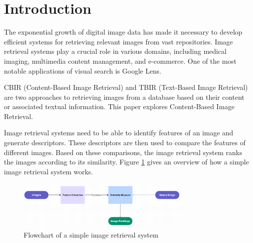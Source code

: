 \section{Introduction}
\label{sec:intro}

The exponential growth of digital image data has made it necessary to develop efficient systems for retrieving
relevant images from vast repositories. Image retrieval systems play a crucial role in various domains, including
medical imaging, multimedia content management, and e-commerce. One of the most notable applications of visual
search is Google Lens.

CBIR (Content-Based Image Retrieval) and TBIR (Text-Based Image Retrieval) are two approaches to retrieving images
from a database based on their content or associated textual information. This paper explores Content-Based Image
Retrieval.

Image retrieval systems need to be able to identify features of an image and generate descriptors.
These descriptors are then used to compare the features of different
images. Based on these comparisons, the image retrieval system ranks the images according to its similarity.
Figure \ref{fig:image_retrieval_flowchart} gives an overview of how a simple image retrieval system works.

\begin{figure}[htbp]
  \begin{center}
    \includegraphics[width=0.75\textwidth]{./assets/image_retrieval_flowchart.png}
    \caption{Flowchart of a simple image retrieval system}
    \label{fig:image_retrieval_flowchart}
  \end{center}
\end{figure}
